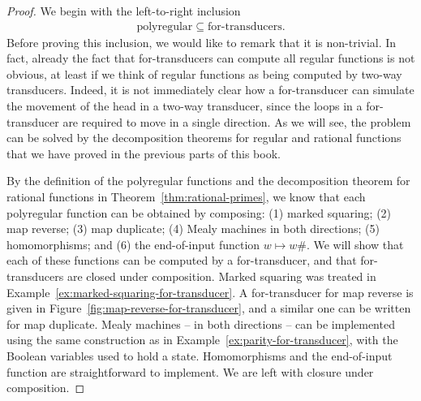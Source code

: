 \begin{proof}
We begin with the left-to-right inclusion
\begin{align*}
\text{polyregular} \subseteq \text{for-transducers}.
\end{align*}
Before proving this inclusion, we would like to remark that it is non-trivial. In fact, already the fact that for-transducers can compute all regular functions is not obvious, at least if we think of regular functions as being computed by two-way transducers. Indeed, it is not immediately clear how a for-transducer can simulate the movement of the head in a two-way transducer, since the loops in a for-transducer are required to move in  a single direction. As we will see, the problem can be solved by the decomposition theorems for regular and rational functions that we have proved in the previous parts of this book.

 By the definition of the polyregular functions and the decomposition theorem for rational functions in Theorem~\ref{thm:rational-primes}, we know that each polyregular function can be obtained by composing: (1) marked squaring; (2) map reverse; (3) map duplicate; (4) Mealy machines in both directions; (5) homomorphisms; and (6) the end-of-input function $w \mapsto w\#$. We will show that each of these functions can be computed by a for-transducer, and that for-transducers are closed under composition. Marked squaring was treated in Example~\ref{ex:marked-squaring-for-transducer}. A for-transducer for map reverse is given in Figure~\ref{fig:map-reverse-for-transducer}, and a similar one can be written for map duplicate. Mealy machines -- in both directions -- can be implemented using the same construction as in Example~\ref{ex:parity-for-transducer}, with the Boolean variables used to hold a state. Homomorphisms and the end-of-input function are straightforward to implement. We are left with closure under composition.







\end{proof}
